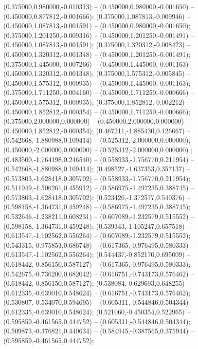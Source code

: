  (0.375000,0.980000,-0.010313) -- (0.450000,0.980000,-0.001650) -- (0.450000,0.877812,-0.001666);
 (0.375000,1.087813,-0.009946) -- (0.450000,1.087813,-0.001591) -- (0.450000,0.980000,-0.001650);
 (0.375000,1.201250,-0.009316) -- (0.450000,1.201250,-0.001491) -- (0.450000,1.087813,-0.001591);
 (0.375000,1.320312,-0.008423) -- (0.450000,1.320312,-0.001348) -- (0.450000,1.201250,-0.001491);
 (0.375000,1.445000,-0.007266) -- (0.450000,1.445000,-0.001163) -- (0.450000,1.320312,-0.001348);
 (0.375000,1.575312,-0.005845) -- (0.450000,1.575312,-0.000935) -- (0.450000,1.445000,-0.001163);
 (0.375000,1.711250,-0.004160) -- (0.450000,1.711250,-0.000666) -- (0.450000,1.575312,-0.000935);
 (0.375000,1.852812,-0.002212) -- (0.450000,1.852812,-0.000354) -- (0.450000,1.711250,-0.000666);
 (0.375000,2.000000,0.000000) -- (0.450000,2.000000,0.000000) -- (0.450000,1.852812,-0.000354);
 (0.467211,-1.885430,0.126667) -- (0.542668,-1.880988,0.109414) -- (0.525312,-2.000000,0.000000);
 (0.450000,-2.000000,0.000000) -- (0.525312,-2.000000,0.000000) ;
 (0.483500,-1.764198,0.246540) -- (0.558933,-1.756770,0.211954) -- (0.542668,-1.880988,0.109414);
 (0.498527,-1.637353,0.357137) -- (0.573803,-1.628418,0.305702) -- (0.558933,-1.756770,0.211954);
 (0.511949,-1.506261,0.455912) -- (0.586975,-1.497235,0.388745) -- (0.573803,-1.628418,0.305702);
 (0.523426,-1.372577,0.540376) -- (0.598158,-1.364731,0.459248) -- (0.586975,-1.497235,0.388745);
 (0.532646,-1.238211,0.608231) -- (0.607089,-1.232579,0.515552) -- (0.598158,-1.364731,0.459248);
 (0.539343,-1.105247,0.657518) -- (0.613547,-1.102562,0.556264) -- (0.607089,-1.232579,0.515552);
 (0.543315,-0.975853,0.686748) -- (0.617365,-0.976495,0.580333) -- (0.613547,-1.102562,0.556264);
 (0.544437,-0.852170,0.695009) -- (0.618442,-0.856150,0.587127) -- (0.617365,-0.976495,0.580333);
 (0.542675,-0.736200,0.682042) -- (0.616751,-0.743173,0.576462) -- (0.618442,-0.856150,0.587127);
 (0.538084,-0.629693,0.648255) -- (0.612335,-0.639010,0.548624) -- (0.616751,-0.743173,0.576462);
 (0.530807,-0.534070,0.594695) -- (0.605311,-0.544846,0.504344) -- (0.612335,-0.639010,0.548624);
 (0.521060,-0.450354,0.522965) -- (0.595859,-0.461565,0.444752) -- (0.605311,-0.544846,0.504344);
 (0.509873,-0.376821,0.440634) -- (0.584945,-0.387565,0.375944) -- (0.595859,-0.461565,0.444752);
